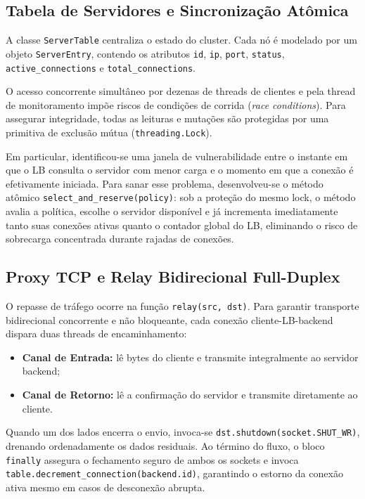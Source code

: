 \documentclass[11pt,a4paper]{article}
\begin{document}
\subsection{Tabela de Servidores e Sincronização Atômica}
A classe \texttt{ServerTable} centraliza o estado do cluster. Cada nó é modelado por um objeto \texttt{ServerEntry}, contendo os atributos \texttt{id}, \texttt{ip}, \texttt{port}, \texttt{status}, \texttt{active\_connections} e \texttt{total\_connections}.

O acesso concorrente simultâneo por dezenas de threads de clientes e pela thread de monitoramento impõe riscos de condições de corrida (\textit{race conditions}). Para assegurar integridade, todas as leituras e mutações são protegidas por uma primitiva de exclusão mútua (\texttt{threading.Lock}).

Em particular, identificou-se uma janela de vulnerabilidade entre o instante em que o LB consulta o servidor com menor carga e o momento em que a conexão é efetivamente iniciada. Para sanar esse problema, desenvolveu-se o método atômico \texttt{select\_and\_reserve(policy)}: sob a proteção do mesmo lock, o método avalia a política, escolhe o servidor disponível e já incrementa imediatamente tanto suas conexões ativas quanto o contador global do LB, eliminando o risco de sobrecarga concentrada durante rajadas de conexões.

\subsection{Proxy TCP e Relay Bidirecional Full-Duplex}
O repasse de tráfego ocorre na função \texttt{relay(src, dst)}. Para garantir transporte bidirecional concorrente e não bloqueante, cada conexão cliente-LB-backend dispara duas threads de encaminhamento:
\begin{itemize}
    \item \textbf{Canal de Entrada:} lê bytes do cliente e transmite integralmente ao servidor backend;
    \item \textbf{Canal de Retorno:} lê a confirmação do servidor e transmite diretamente ao cliente.
\end{itemize}
Quando um dos lados encerra o envio, invoca-se \texttt{dst.shutdown(socket.SHUT\_WR)}, drenando ordenadamente os dados residuais. Ao término do fluxo, o bloco \texttt{finally} assegura o fechamento seguro de ambos os sockets e invoca \texttt{table.decrement\_connection(backend.id)}, garantindo o estorno da conexão ativa mesmo em casos de desconexão abrupta.
\end{document}
